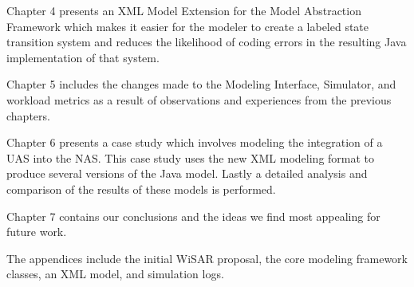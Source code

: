 Chapter 4 presents an XML Model Extension for the Model Abstraction Framework which makes it easier for the modeler to create a labeled state transition system and reduces the likelihood of coding errors in the resulting Java implementation of that system.

Chapter 5 includes the changes made to the Modeling Interface, Simulator, and workload metrics as a result of observations and experiences from the previous chapters.  

Chapter 6 presents a case study which involves modeling the integration of a UAS into the NAS.  This case study uses the new XML modeling format to produce several versions of the Java model.  Lastly a detailed analysis and comparison of the results of these models is performed.

Chapter 7 contains our conclusions and the ideas we find most appealing for future work.

The appendices include the initial WiSAR proposal, the core modeling framework classes, an XML model, and simulation logs.
